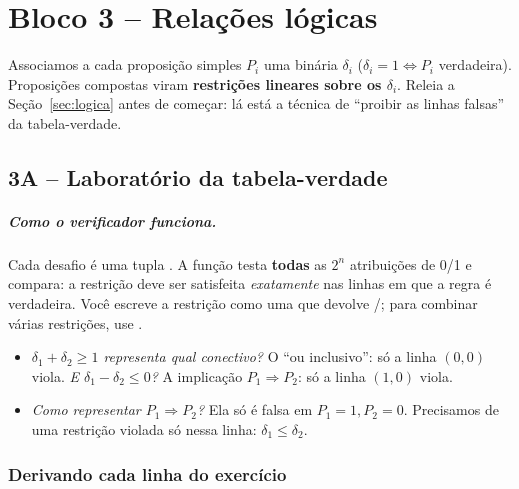 \chapter{Bloco 3 -- Relações lógicas}
\label{cap:bloco3}

Associamos a cada proposição simples $P_i$ uma binária $\delta_i$ ($\delta_i=1\iff P_i$ verdadeira). Proposições
compostas viram \textbf{restrições lineares sobre os $\delta_i$}. Releia a Seção~\ref{sec:logica} antes de
começar: lá está a técnica de ``proibir as linhas falsas'' da tabela-verdade.

\section{3A -- Laboratório da tabela-verdade}

\paragraph{Como o verificador funciona.} Cada desafio é uma tupla
. A função  testa \textbf{todas} as
$2^n$ atribuições de 0/1 e compara: a restrição deve ser satisfeita \emph{exatamente} nas linhas em que a regra é
verdadeira. Você escreve a restrição como uma  que devolve /; para combinar várias
restrições, use .

\begin{discussao}
\begin{itemize}
  \item \emph{$\delta_1+\delta_2\ge1$ representa qual conectivo?} O ``ou inclusivo'': só a linha $(0,0)$ viola.
  \emph{E $\delta_1-\delta_2\le0$?} A implicação $P_1\Rightarrow P_2$: só a linha $(1,0)$ viola.
  \item \emph{Como representar $P_1\Rightarrow P_2$?} Ela só é falsa em $P_1=1, P_2=0$. Precisamos de uma restrição
  violada só nessa linha: $\delta_1\le\delta_2$.
\end{itemize}
\end{discussao}

\subsection*{Derivando cada linha do exercício}


